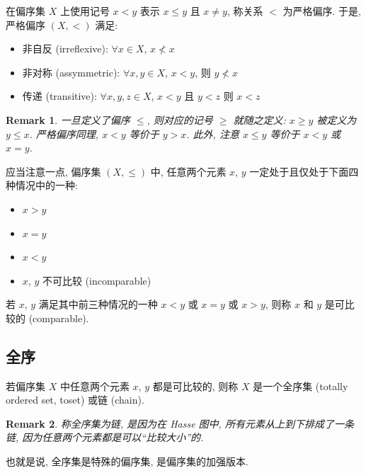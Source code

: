 \documentclass[UTF8]{ctexart}
\theoremstyle{mystyle}
\theoremstyle{myremark}
\newtheorem*{remark}{Remark}
\theoremstyle{plain}
\begin{document}
\begin{definition}
    在偏序集 $ X $ 上使用记号 $ x < y $ 表示 $ x \le y $ 且 $ x \neq y $, 称关系 $ < $ 为严格偏序. 于是, 严格偏序 $ (X, <) $ 满足:
    \begin{itemize}
        \item 非自反 (irreflexive): $ \forall x \in X $, $ x \not < x $
        \item 非对称 (assymmetric): $ \forall x, y \in X $, $ x < y $, 则 $ y \not < x $
        \item 传递 (transitive): $ \forall x, y, z \in X $, $ x < y $ 且 $ y < z $ 则 $ x < z $
    \end{itemize}
\end{definition}

\begin{remark}
    一旦定义了偏序 $ \le $, 则对应的记号 $ \ge $ 就随之定义: $ x \ge y $ 被定义为 $ y \le x $. 严格偏序同理, $ x < y $ 等价于 $ y > x $. 此外, 注意 $ x \le y $ 等价于 $ x < y $ 或 $ x = y $.
\end{remark}

应当注意一点, 偏序集 $ (X, \le) $ 中, 任意两个元素 $ x $, $ y $ 一定处于且仅处于下面四种情况中的一种:
\begin{itemize}
    \item $ x > y $
    \item $ x = y $
    \item $ x < y $
    \item $ x $, $ y $ 不可比较 (incomparable)
\end{itemize}

若 $ x $, $ y $ 满足其中前三种情况的一种 $ x < y $ 或 $ x = y $ 或 $ x > y $, 则称 $ x $ 和 $ y $ 是可比较的 (comparable).

\subsection{全序}
\begin{definition}
    若偏序集 $ X $ 中任意两个元素 $ x $, $ y $ 都是可比较的, 则称 $ X $ 是一个全序集 (totally ordered set, toset) 或链 (chain).
\end{definition}

\begin{remark}
    称全序集为链, 是因为在 Hasse 图中, 所有元素从上到下排成了一条链, 因为任意两个元素都是可以``比较大小''的.
\end{remark}

也就是说, 全序集是特殊的偏序集, 是偏序集的加强版本.
\end{document}
